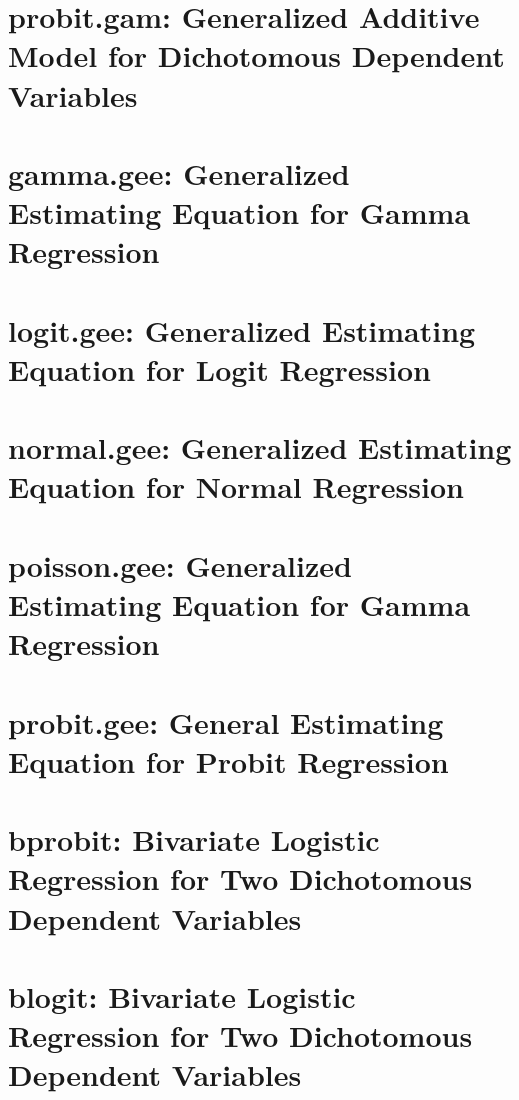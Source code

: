\documentclass{book}
\begin{document}
\chapter[probit.gam]{probit.gam: Generalized Additive Model for Dichotomous Dependent Variables}
\label{chapter:probit.gam}


\chapter[gamma.gee]{gamma.gee: Generalized Estimating Equation for Gamma Regression}
\label{chapter:gamma.gee}


\chapter[logit.gee]{logit.gee: Generalized Estimating Equation for Logit Regression}
\label{chapter:logit.gee}


\chapter[normal.gee]{normal.gee: Generalized Estimating Equation for Normal Regression}
\label{chapter:normal.gee}


\chapter[poisson.gee]{poisson.gee: Generalized Estimating Equation for Gamma Regression}
\label{chapter:poisson.gee}


\chapter[probit.gee]{probit.gee: General Estimating Equation for Probit Regression}
\label{chapter:}


\chapter[bprobit]{bprobit: Bivariate Logistic Regression for Two Dichotomous Dependent Variables}
\label{chapter:Bprobit}


\chapter[blogit]{blogit: Bivariate Logistic Regression for Two Dichotomous Dependent Variables}
\label{chapter:Blogit}

\end{document}
